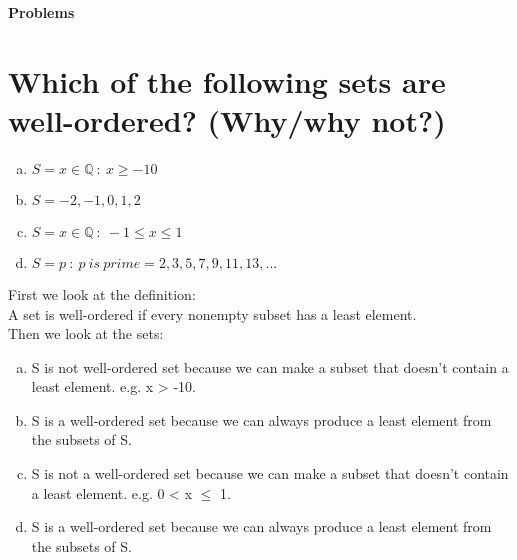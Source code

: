 \textbf{\Huge Problems}
\section{Which of the following sets are well-ordered? (Why/why not?)}
\begin{enumerate}[a.]
\item $S={x\in\mathbb{Q}\ :\ x\geq-10}$
\item $S={-2,-1,0,1,2}$
\item $S={x\in\mathbb{Q}\ :\ -1\leq x\leq 1}$
\item $S={p\ : \ p\ is\ prime} = {2,3,5,7,9,11,13,...}$
\end{enumerate}
First we look at the definition:\\
A set is well-ordered if every nonempty subset has a least element.\\
Then we look at the sets:\\
\begin{enumerate}[a.]
\item S is not well-ordered set because we can make a subset that doesn't contain a least element. e.g. x > -10. 
\item S is a well-ordered set because we can always produce a least element from the subsets of S.
\item S is not a well-ordered set because we can make a subset that doesn't contain a least element. e.g. 0 < x $\leq$ 1.
\item S is a well-ordered set because we can always produce a least element from the subsets of S.
\end{enumerate}

